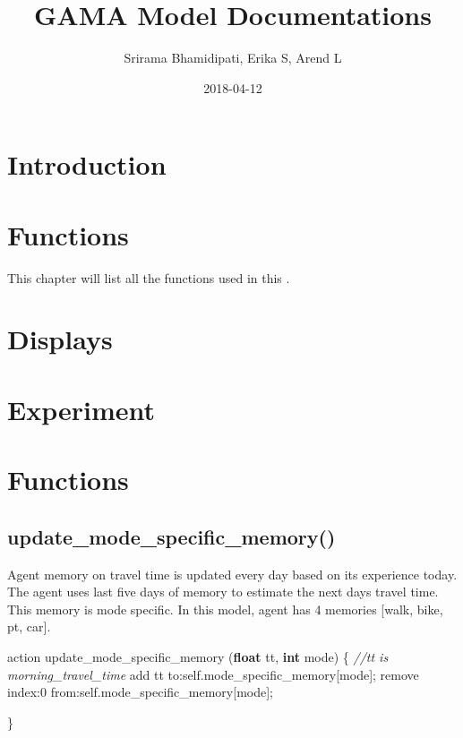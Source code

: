 \documentclass[]{book}
\title{GAMA Model Documentations}
\author{Srirama Bhamidipati, Erika S, Arend L}
\date{2018-04-12}
\newenvironment{Shaded}{\begin{snugshade}}{\end{snugshade}}
\newcommand{\CommentTok}[1]{\textcolor[rgb]{0.56,0.35,0.01}{\textit{#1}}}
\newcommand{\DecValTok}[1]{\textcolor[rgb]{0.00,0.00,0.81}{#1}}
\newcommand{\KeywordTok}[1]{\textcolor[rgb]{0.13,0.29,0.53}{\textbf{#1}}}
\newcommand{\NormalTok}[1]{#1}
\newcommand{\OtherTok}[1]{\textcolor[rgb]{0.56,0.35,0.01}{#1}}
\theoremstyle{definition}
\theoremstyle{definition}
\theoremstyle{definition}
\theoremstyle{remark}
\begin{document}
\maketitle

{
\setcounter{tocdepth}{1}
\tableofcontents
}
\hypertarget{introduction}{%
\chapter{Introduction}\label{introduction}}

\hypertarget{functions}{%
\chapter{Functions}\label{functions}}

This chapter will list all the functions used in this .

\hypertarget{displays}{%
\chapter{Displays}\label{displays}}

\hypertarget{experiment}{%
\chapter{Experiment}\label{experiment}}

\hypertarget{functions-1}{%
\chapter{Functions}\label{functions-1}}

\hypertarget{update_mode_specific_memory}{%
\section{update\_mode\_specific\_memory()}\label{update_mode_specific_memory}}

Agent memory on travel time is updated every day based on its experience
today. The agent uses last five days of memory to estimate the next days
travel time. This memory is mode specific. In this model, agent has 4
memories {[}walk, bike, pt, car{]}.

\begin{Shaded}
\begin{Highlighting}[]
\NormalTok{action update_mode_specific_memory }\OtherTok{(}\KeywordTok{float}\NormalTok{ tt}\OtherTok{,} \KeywordTok{int}\NormalTok{ mode}\OtherTok{)}
\NormalTok{  \{}
        \CommentTok{//tt is morning_travel_time}
\NormalTok{        add tt to:self.mode_specific_memory}\OtherTok{[}\NormalTok{mode}\OtherTok{];}
\NormalTok{        remove index:}\DecValTok{0}\NormalTok{ from:self.mode_specific_memory}\OtherTok{[}\NormalTok{mode}\OtherTok{];}
        
\NormalTok{    \}}
\end{Highlighting}
\end{Shaded}
\end{document}
